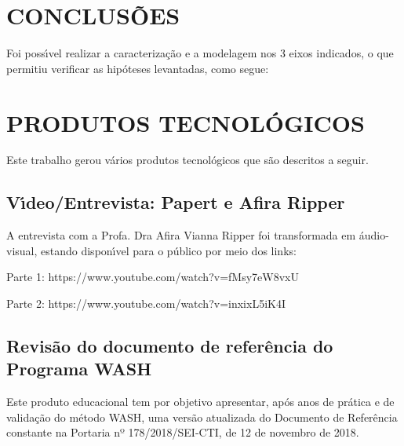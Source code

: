 \documentclass[
12pt,		%
openright,	%
twoside,  %
a4paper,			%
chapter=TITLE,		%
english,			%
french,				%
spanish,			%
brazil				%
]{USPSC-classe/USPSC}
\begin{document}
\chapter[CONCLUS\~OES]{CONCLUS\~OES}\label{CONCLUS\~OES}
Foi poss\'{\i}vel realizar a caracteriza\c{c}\~ao e a modelagem nos 3 eixos indicados, o que permitiu verificar as hip\'oteses levantadas, como segue:










\chapter[PRODUTOS TECNOL\'OGICOS]{PRODUTOS TECNOL\'OGICOS}\label{PRODUTOS TECNOL\'OGICOS}
Este trabalho gerou v\'arios produtos tecnol\'ogicos que s\~ao descritos a seguir.










\section[V\'{\i}deo/Entrevista: Papert e Afira Ripper]{V\'{\i}deo/Entrevista: Papert e Afira Ripper}\label{V\'{\i}deo/Entrevista: Papert e Afira Ripper}
A entrevista com a Profa. Dra Afira Vianna Ripper foi transformada em \'audio-visual, estando dispon\'{\i}vel para o p\'ublico por meio dos links:











\begin{alineas}
\item Parte 1: https://www.youtube.com/watch?v=fMsy7eW8vxU
\item Parte 2: https://www.youtube.com/watch?v=inxixL5iK4I
\end{alineas}

\section[Revis\~ao do documento de refer\^encia do Programa WASH]{Revis\~ao do documento de refer\^encia do Programa WASH}\label{Revis\~ao do documento de refer\^encia do Programa WASH}
Este produto educacional tem por objetivo apresentar, ap\'os anos de pr\'atica e de valida\c{c}\~ao do m\'etodo WASH, uma vers\~ao atualizada do Documento de Refer\^encia constante na Portaria nº 178/2018/SEI-CTI, de 12 de novembro de 2018.
\end{document}
